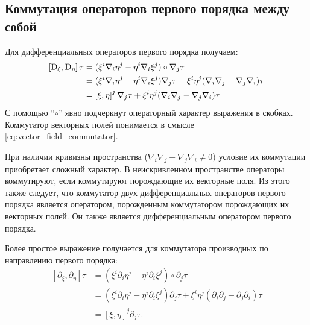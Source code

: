 \documentclass[12pt,a4paper]{article}
\begin{document}
        \subsection{Коммутация операторов первого порядка между собой}

            Для дифференциальных операторов первого порядка получаем:
            \begin{equation}\begin{aligned}
                \left[ \operatorname{D}_\xi, \operatorname{D}_\eta \right] \tau
                    &= (\xi^i \nabla_i \eta^j - \eta^i \nabla_i \xi^j) \circ \nabla_j \tau \\
                    &= (\xi^i \nabla_i \eta^j - \eta^i \nabla_i \xi^j) \nabla_j \tau
                        + \xi^i \eta^j (\nabla_i \nabla_j - \nabla_j \nabla_i) \tau \\
                    &= \left[ \xi, \eta \right]^j \nabla_j \tau
                        + \xi^i \eta^j (\nabla_i \nabla_j - \nabla_j \nabla_i) \tau
            \end{aligned}\end{equation}
            С помощью \enquote{$\circ$} явно подчеркнут операторный характер выражения в скобках. Коммутатор векторных полей понимается в смысле \autoref{eq:vector_field_commutator}.

            При наличии кривизны пространства ($\nabla_i \nabla_j - \nabla_j \nabla_i \neq 0$) условие их коммутации приобретает сложный характер. В неискривленном пространстве операторы коммутируют, если коммутируют порождающие их векторные поля. Из этого также следует, что коммутатор двух дифференциальных операторов первого порядка является оператором, порожденным коммутатором порождающих их векторных полей. Он также является дифференциальным оператором первого порядка.

            Более простое выражение получается для коммутатора производных по направлению первого порядка:
            \begin{equation}\begin{aligned}
                \left[ \partial_\xi, \partial_\eta \right] \tau
                    &= (\xi^i \partial_i \eta^j - \eta^i \partial_i \xi^j) \circ \partial_j \tau \\
                    &= (\xi^i \partial_i \eta^j - \eta^i \partial_i \xi^j) \partial_j \tau
                        + \xi^i \eta^j (\partial_i \partial_j - \partial_j \partial_i) \tau \\
                    &= \left[ \xi, \eta \right]^j \partial_j \tau .
            \end{aligned}\end{equation}
\end{document}
